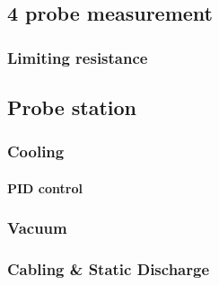 \documentclass[../../Matt_Gebert_Honours_Thesis.tex]{subfiles}
\begin{document}
	
	\subsection{4 probe measurement}
	\subsubsection{Limiting resistance}
	
	\subsection{Probe station}
	\subsubsection{Cooling}
	\paragraph{PID control}
	\subsubsection{Vacuum}
	\subsubsection{Cabling \& Static Discharge}
	
\end{document}
